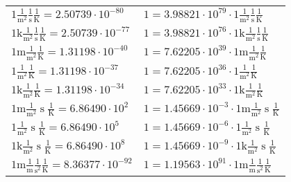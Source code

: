\begin{center}
\begin{longtable}{l l}
{\color{black}$1 \bm{\mathrm{ }}\frac1{\operatorname{m}^2}\frac1{\operatorname{s}}{}\frac1{\operatorname{K}} = 2.50739\cdot10^{-80} $}   & {\color{black}$ 1 = 3.98821\cdot10^{79} \cdot 1 \bm{\mathrm{ }}\frac1{\operatorname{m}^2}\frac1{\operatorname{s}}{}\frac1{\operatorname{K}}$}  \\
{\color{gray}$1 \bm{\mathrm{ k}}\frac1{\operatorname{m}^2}\frac1{\operatorname{s}}{}\frac1{\operatorname{K}} = 2.50739\cdot10^{-77} $}   & {\color{gray}$ 1 = 3.98821\cdot10^{76} \cdot 1 \bm{\mathrm{ k}}\frac1{\operatorname{m}^2}\frac1{\operatorname{s}}{}\frac1{\operatorname{K}}$}  \\
{\color{gray}$1 \bm{\mathrm{ m}}\frac1{\operatorname{m}^2}{}{}\frac1{\operatorname{K}} = 1.31198\cdot10^{-40} $}   & {\color{gray}$ 1 = 7.62205\cdot10^{39} \cdot 1 \bm{\mathrm{ m}}\frac1{\operatorname{m}^2}{}{}\frac1{\operatorname{K}}$}  \\
{\color{black}$1 \bm{\mathrm{ }}\frac1{\operatorname{m}^2}{}{}\frac1{\operatorname{K}} = 1.31198\cdot10^{-37} $}   & {\color{black}$ 1 = 7.62205\cdot10^{36} \cdot 1 \bm{\mathrm{ }}\frac1{\operatorname{m}^2}{}{}\frac1{\operatorname{K}}$}  \\
{\color{gray}$1 \bm{\mathrm{ k}}\frac1{\operatorname{m}^2}{}{}\frac1{\operatorname{K}} = 1.31198\cdot10^{-34} $}   & {\color{gray}$ 1 = 7.62205\cdot10^{33} \cdot 1 \bm{\mathrm{ k}}\frac1{\operatorname{m}^2}{}{}\frac1{\operatorname{K}}$}  \\
{\color{gray}$1 \bm{\mathrm{ m}}\frac1{\operatorname{m}^2}{\operatorname{s}}{}\frac1{\operatorname{K}} = 6.86490\cdot10^{2} $}   & {\color{gray}$ 1 = 1.45669\cdot10^{-3} \cdot 1 \bm{\mathrm{ m}}\frac1{\operatorname{m}^2}{\operatorname{s}}{}\frac1{\operatorname{K}}$}  \\
{\color{black}$1 \bm{\mathrm{ }}\frac1{\operatorname{m}^2}{\operatorname{s}}{}\frac1{\operatorname{K}} = 6.86490\cdot10^{5} $}   & {\color{black}$ 1 = 1.45669\cdot10^{-6} \cdot 1 \bm{\mathrm{ }}\frac1{\operatorname{m}^2}{\operatorname{s}}{}\frac1{\operatorname{K}}$}  \\
{\color{gray}$1 \bm{\mathrm{ k}}\frac1{\operatorname{m}^2}{\operatorname{s}}{}\frac1{\operatorname{K}} = 6.86490\cdot10^{8} $}   & {\color{gray}$ 1 = 1.45669\cdot10^{-9} \cdot 1 \bm{\mathrm{ k}}\frac1{\operatorname{m}^2}{\operatorname{s}}{}\frac1{\operatorname{K}}$}  \\
{\color{gray}$1 \bm{\mathrm{ m}}\frac1{\operatorname{m}}\frac1{\operatorname{s}^2}{}\frac1{\operatorname{K}} = 8.36377\cdot10^{-92} $}   & {\color{gray}$ 1 = 1.19563\cdot10^{91} \cdot 1 \bm{\mathrm{ m}}\frac1{\operatorname{m}}\frac1{\operatorname{s}^2}{}\frac1{\operatorname{K}}$}  \\

\end{longtable}
\end{center}
